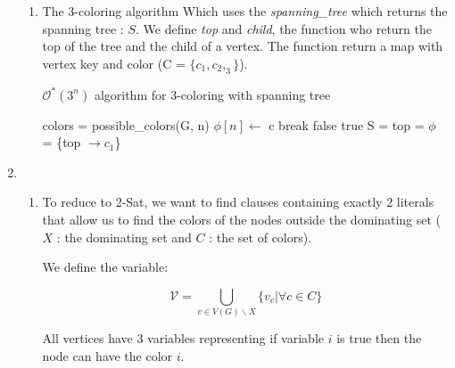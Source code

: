 \documentclass{article}
\theoremstyle{plain}
\begin{document}
\begin{enumerate}
\begin{enumerate}
        \item The 3-coloring algorithm Which uses the \textit{spanning\_tree}
          which returns the spanning tree : $S$. We define \textit{top} and
          \textit{child}, the function who return the top of the tree and the
          child of a vertex. The function return a map with vertex key and color
          (C = $\{c_1, c_2, _3\}$).
          \begin{algorithm}
          \caption{$\mathcal O^*(3^n)$ algorithm for 3-coloring with spanning tree}
          \label{tree_color}
          \begin{algorithmic}[1]
              \State colors = possible\_colors(G, n)
                \State $\phi[n] \leftarrow$ c
                  \State break
                \EndIf
              \EndFor
            \State \Return false
            \EndFor
            \State \Return true
            \EndFunction
            \State
            \State S = 
            \State top = 
            \State $\phi$ = \{top $\to c_1$\}
            \State \Return {}
            \EndFunction
          \end{algorithmic}
          \end{algorithm}
      \end{enumerate}

    \newpage
    \item
      \begin{enumerate}
        \item To reduce to 2-Sat, we want to find clauses containing exactly 2
          literals that allow us to find the colors of the nodes outside
          the dominating set ($X$ : the dominating set and $C$ :
          the set of colors).

          We define the variable:

          $$\mathcal V = \bigcup_{v \in V(G) \backslash X} \{v_c  | \forall c
          \in C\}$$

          All vertices have 3 variables representing if variable $i$ is true then
          the node can have the color $i$.


\end{enumerate}
\end{enumerate}
\end{document}
